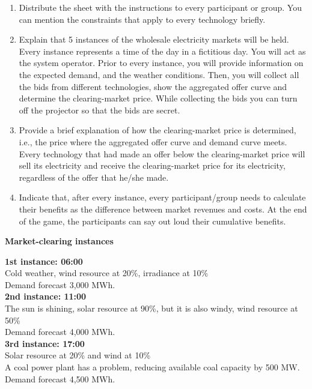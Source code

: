 \documentclass[3p]{elsarticle} %
\begin{document}
\begin{enumerate}

\item Distribute the sheet with the instructions to every participant or group. You can mention the constraints that apply to every technology briefly. 

\item	Explain that 5 instances of the wholesale electricity markets will be held. Every instance represents a time of the day in a fictitious day. You will act as the system operator. Prior to every instance, you will provide information on the expected demand, and the weather conditions. Then, you will collect all the bids from different technologies, show the aggregated offer curve and determine the clearing-market price. While collecting the bids you can turn off the projector so that the bids are secret. 

\item Provide a brief explanation of how the clearing-market price is determined, i.e., the price where the aggregated offer curve and demand curve meets. Every technology that had made an offer below the clearing-market price will sell its electricity and receive the clearing-market price for its electricity, regardless of the offer that he/she made. 

\item	Indicate that, after every instance, every participant/group needs to calculate their benefits as the difference between market revenues and costs.  At the end of the game, the participants can say out loud their cumulative benefits. 

\end{enumerate}

\textbf{Market-clearing instances}

\textbf{1st instance: 06:00} \\
Cold weather, wind resource at 20\%, irradiance at 10\% \\
Demand forecast 3,000 MWh. \\

\textbf{2nd instance: 11:00} \\
The sun is shining, solar resource at 90\%, but it is also windy, wind resource at 50\% \\
Demand forecast 4,000 MWh. \\

\textbf{3rd instance: 17:00 } \\
Solar resource at 20\% and wind at 10\% \\
A coal power plant has a problem, reducing available coal capacity by 500 MW.\\
Demand forecast 4,500 MWh. \\
\end{document}
